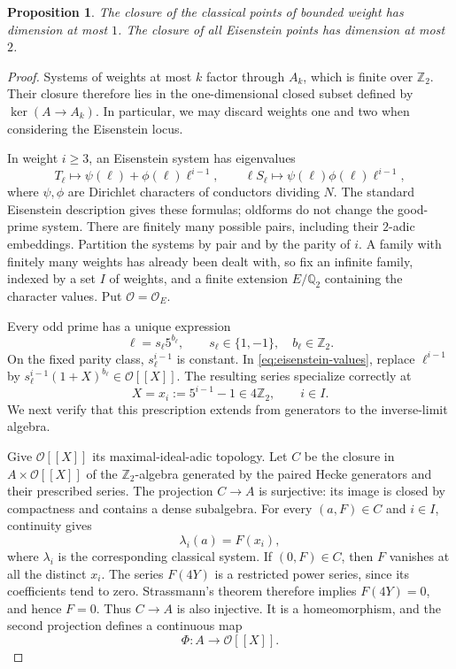 \documentclass[11pt]{article}
\newtheorem{proposition}[theorem]{Proposition}
\theoremstyle{remark}
\numberwithin{equation}{section}
\newcommand{\Z}{\mathbb Z}
\newcommand{\Q}{\mathbb Q}
\newcommand{\OO}{\mathcal O}
\begin{document}
\begin{proposition}\label{prop:exceptional}
The closure of the classical points of bounded weight has dimension
at most $1$. The closure of all Eisenstein points has dimension at
most $2$.
\end{proposition}
\begin{proof}
Systems of weights at most $k$ factor through $A_k$, which is
finite over $\Z_2$. Their closure therefore lies in the
one-dimensional closed subset defined by $\ker(A\to A_k)$.
In particular, we may discard weights one and two when considering
the Eisenstein locus.

In weight $i\geq3$, an Eisenstein system has eigenvalues
\begin{equation}\label{eq:eisenstein-values}
 T_\ell\longmapsto\psi(\ell)+\phi(\ell)\ell^{i-1},
 \qquad
 \ell S_\ell\longmapsto\psi(\ell)\phi(\ell)\ell^{i-1},
\end{equation}
where $\psi,\phi$ are Dirichlet characters of conductors dividing
$N$. The standard Eisenstein description gives these formulas;
oldforms do not change the good-prime system. There are finitely
many possible pairs, including their $2$-adic embeddings.
Partition the systems by pair and by the parity of $i$. A family
with finitely many weights has already been dealt with, so fix an
infinite family, indexed by a set $I$ of weights, and a finite
extension $E/\Q_2$ containing the character values. Put $\OO=\OO_E$.

Every odd prime has a unique expression
\[
 \ell=s_\ell5^{b_\ell},\qquad
 s_\ell\in\{1,-1\},\quad b_\ell\in\Z_2.
\]
On the fixed parity class, $s_\ell^{i-1}$ is constant. In
\eqref{eq:eisenstein-values}, replace $\ell^{i-1}$ by
$s_\ell^{i-1}(1+X)^{b_\ell}\in\OO[[X]]$. The resulting
series specialize correctly at
\begin{equation}\label{eq:weight-specialization}
 X=x_i:=5^{i-1}-1\in4\Z_2,\qquad i\in I.
\end{equation}
We next verify that this prescription extends from generators to
the inverse-limit algebra.

Give $\OO[[X]]$ its maximal-ideal-adic topology. Let $C$ be the
closure in $A\times\OO[[X]]$ of the $\Z_2$-algebra generated by
the paired Hecke generators and their prescribed series. The
projection $C\to A$ is surjective: its image is closed by
compactness and contains a dense subalgebra. For every $(a,F)\in C$
and $i\in I$, continuity gives
\begin{equation}\label{eq:graph-evaluation}
 \lambda_i(a)=F(x_i),
\end{equation}
where $\lambda_i$ is the corresponding classical system.
If $(0,F)\in C$, then $F$ vanishes at all the distinct $x_i$.
The series $F(4Y)$ is a restricted power series, since its
coefficients tend to zero. Strassmann's theorem therefore implies
$F(4Y)=0$, and hence $F=0$. Thus $C\to A$ is also injective.
It is a homeomorphism, and the second projection defines a
continuous map
\begin{equation}\label{eq:eisenstein-map}
 \Phi:A\longrightarrow\OO[[X]].
\end{equation}


\end{proof}
\end{document}
